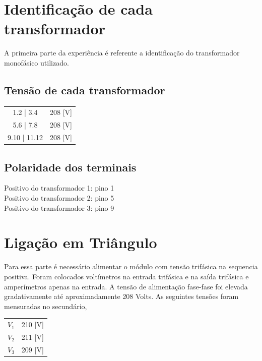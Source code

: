 \documentclass[paper=a4, fontsize=11pt]{article}
\begin{document}
\section{Identificação de cada transformador}

A primeira parte da experiência é referente a identificação do transformador monofásico
utilizado.

\subsection{Tensão de cada transformador}
\renewcommand{\arraystretch}{1.5}
\begin{center}
    \begin{tabular}{c||c}
        1.2 | 3.4 & 208 [V] \\
        5.6 | 7.8 & 208 [V] \\
        9.10 | 11.12 & 208 [V] \\
    \end{tabular}
\end{center}

\subsection{Polaridade dos terminais}

Positivo do transformador 1: pino 1\\
Positivo do transformador 2: pino 5\\
Positivo do transformador 3: pino 9\\

\section{Ligação em Triângulo}

Para essa parte é necessário alimentar o módulo com tensão trifásica na sequencia 
positiva. Foram colocados voltímetros na entrada trifásica e na saída trifásica e 
amperímetros apenas na entrada. A tensão de alimentação fase-fase foi elevada 
gradativamente até aproximadamente 208 Volts. As seguintes tensões foram mensuradas
no secundário,


\begin{center}
    \begin{tabular}{c||c}
        $V_1$ & 210 [V] \\
        $V_2$ & 211 [V] \\
        $V_3$ & 209 [V] \\
    \end{tabular}
\end{center}
\end{document}
